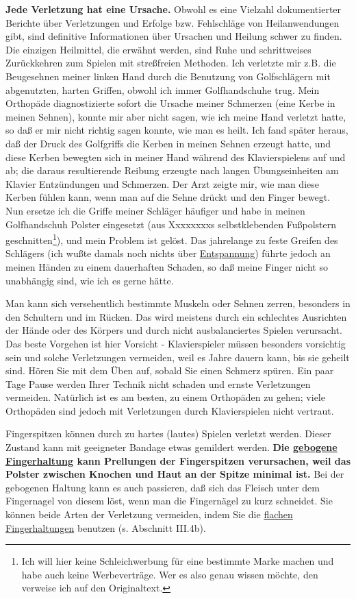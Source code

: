 \textbf{Jede Verletzung hat eine Ursache.}
Obwohl es eine Vielzahl dokumentierter Berichte über Verletzungen und Erfolge bzw. Fehlschläge von Heilanwendungen gibt, sind definitive Informationen über Ursachen und Heilung schwer zu finden.
Die einzigen Heilmittel, die erwähnt werden, sind Ruhe und schrittweises Zurückkehren zum Spielen mit streßfreien Methoden.
Ich verletzte mir z.B. die Beugesehnen meiner linken Hand durch die Benutzung von Golfschlägern mit abgenutzten, harten Griffen, obwohl ich immer Golfhandschuhe trug.
Mein Orthopäde diagnostizierte sofort die Ursache meiner Schmerzen (eine Kerbe in meinen Sehnen), konnte mir aber nicht sagen, wie ich meine Hand verletzt hatte, so daß er mir nicht richtig sagen konnte, wie man es heilt.
Ich fand später heraus, daß der Druck des Golfgriffs die Kerben in meinen Sehnen erzeugt hatte, und diese Kerben bewegten sich in meiner Hand während des Klavierspielens auf und ab; die daraus resultierende Reibung erzeugte nach langen Übungseinheiten am Klavier Entzündungen und Schmerzen.
Der Arzt zeigte mir, wie man diese Kerben fühlen kann, wenn man auf die Sehne drückt und den Finger bewegt.
Nun ersetze ich die Griffe meiner Schläger häufiger und habe in meinen Golfhandschuh Polster eingesetzt (aus Xxxxxxxxs selbstklebenden Fußpolstern geschnitten\footnote{Ich will hier keine Schleichwerbung für eine bestimmte Marke machen und habe auch keine Werbeverträge. Wer es also genau wissen möchte, den verweise ich auf den Originaltext.}), und mein Problem ist gelöst.
Das jahrelange zu feste Greifen des Schlägers (ich wußte damals noch nichts über \hyperref[c1ii14]{Entspannung}) führte jedoch an meinen Händen zu einem dauerhaften Schaden, so daß meine Finger nicht so unabhängig sind, wie ich es gerne hätte.

Man kann sich versehentlich bestimmte Muskeln oder Sehnen zerren, besonders in den Schultern und im Rücken.
Das wird meistens durch ein schlechtes Ausrichten der Hände oder des Körpers und durch nicht ausbalanciertes Spielen verursacht.
Das beste Vorgehen ist hier Vorsicht - Klavierspieler müssen besonders vorsichtig sein und solche Verletzungen vermeiden, weil es Jahre dauern kann, bis sie geheilt sind.
Hören Sie mit dem Üben auf, sobald Sie einen Schmerz spüren.
Ein paar Tage Pause werden Ihrer Technik nicht schaden und ernste Verletzungen vermeiden.
Natürlich ist es am besten, zu einem Orthopäden zu gehen; viele Orthopäden sind jedoch mit Verletzungen durch Klavierspielen nicht vertraut.

Fingerspitzen können durch zu hartes (lautes) Spielen verletzt werden.
Dieser Zustand kann mit geeigneter Bandage etwas gemildert werden.
\textbf{Die \hyperref[c1ii2]{gebogene Fingerhaltung} kann Prellungen der Fingerspitzen verursachen, weil das Polster zwischen Knochen und Haut an der Spitze minimal ist.}
Bei der gebogenen Haltung kann es auch passieren, daß sich das Fleisch unter dem Fingernagel von diesem löst, wenn man die Fingernägel zu kurz schneidet.
Sie können beide Arten der Verletzung vermeiden, indem Sie die \hyperref[c1iii4b]{flachen Fingerhaltungen} benutzen (s. Abschnitt III.4b).

